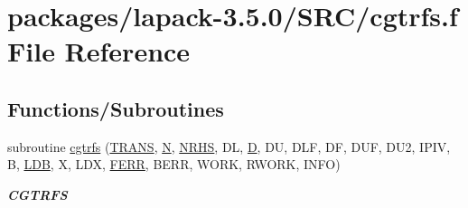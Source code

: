 \hypertarget{cgtrfs_8f}{}\section{packages/lapack-\/3.5.0/\+S\+R\+C/cgtrfs.f File Reference}
\label{cgtrfs_8f}
\subsection*{Functions/\+Subroutines}
\begin{DoxyCompactItemize}
\item 
subroutine \hyperlink{group__complexGTcomputational_ga92eec53c6ac6c6285a10e7d05d9c00d5}{cgtrfs} (\hyperlink{superlu__enum__consts_8h_a0c4e17b2d5cea33f9991ccc6a6678d62a1f61e3015bfe0f0c2c3fda4c5a0cdf58}{T\+R\+A\+N\+S}, \hyperlink{polmisc_8c_a0240ac851181b84ac374872dc5434ee4}{N}, \hyperlink{example__user_8c_aa0138da002ce2a90360df2f521eb3198}{N\+R\+H\+S}, D\+L, \hyperlink{odrpack_8h_a7dae6ea403d00f3687f24a874e67d139}{D}, D\+U, D\+L\+F, D\+F, D\+U\+F, D\+U2, I\+P\+I\+V, B, \hyperlink{example__user_8c_a50e90a7104df172b5a89a06c47fcca04}{L\+D\+B}, X, L\+D\+X, \hyperlink{superlu__enum__consts_8h_af00a42ecad444bbda75cde1b64bd7e72a78fd14d7abebae04095cfbe02928f153}{F\+E\+R\+R}, B\+E\+R\+R, W\+O\+R\+K, R\+W\+O\+R\+K, I\+N\+F\+O)
\begin{DoxyCompactList}\small\item\em {\bfseries C\+G\+T\+R\+F\+S} \end{DoxyCompactList}\end{DoxyCompactItemize}
